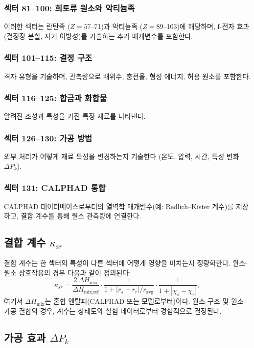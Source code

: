 \documentclass[12pt,a4paper]{article}
\begin{document}
	\subsubsection{섹터 81–100: 희토류 원소와 악티늄족}
	이러한 섹터는 란탄족 (\(Z=57\)–71)과 악티늄족 (\(Z=89\)–103)에 해당하며, f-전자 효과(결정장 분할, 자기 이방성)를 기술하는 추가 매개변수를 포함한다.
	
	\subsubsection{섹터 101–115: 결정 구조}
	격자 유형을 기술하며, 관측량으로 배위수, 충전율, 형성 에너지, 허용 원소를 포함한다.
	
	\subsubsection{섹터 116–125: 합금과 화합물}
	알려진 조성과 특성을 가진 특정 재료를 나타낸다.
	
	\subsubsection{섹터 126–130: 가공 방법}
	외부 처리가 어떻게 재료 특성을 변경하는지 기술한다 (온도, 압력, 시간, 특성 변화 \(\Delta P_k\)).
	
	\subsubsection{섹터 131: CALPHAD 통합}
	CALPHAD 데이터베이스로부터의 열역학 매개변수(예: Redlich–Kister 계수)를 저장하고, 결합 계수를 통해 원소 관측량에 연결한다.
	
	\subsection{결합 계수 \(\kappa_{sr}\)}
	
	결합 계수는 한 섹터의 특성이 다른 섹터에 어떻게 영향을 미치는지 정량화한다. 원소-원소 상호작용의 경우 다음과 같이 정의된다:
	\[
	\kappa_{sr} = \frac{2\,\Delta H_{\text{mix}}}{\Delta H_{\text{mix,ref}}} \cdot
	\frac{1}{1 + |r_s - r_r|/r_{\text{avg}}} \cdot
	\frac{1}{1 + |\chi_s - \chi_r|},
	\]
	여기서 \(\Delta H_{\text{mix}}\)는 혼합 엔탈피(CALPHAD 또는 모델로부터)이다. 원소-구조 및 원소-가공 결합의 경우, 계수는 상태도와 실험 데이터로부터 경험적으로 결정된다.
	
	\subsection{가공 효과 \(\Delta P_k\)}
	\label{sec:processing}
	
\end{document}
